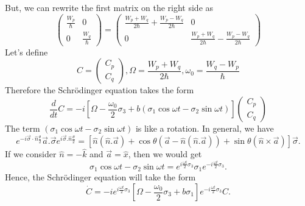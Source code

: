 But, we can rewrite the first matrix on the right side as
\begin{equation}
\left( \begin{array}{cc}
\frac{W_p}{\hbar} & 0 \\
0 & \frac{W_q}{\hbar}
\end{array} \right) = \left(
\begin{array}{cc}
\frac{W_p+W_q}{2\hbar} + \frac{W_p-W_q}{2\hbar} & 0 \\
0 & \frac{W_p+W_q}{2\hbar}-\frac{W_p-W_q}{2\hbar}
\end{array} \right)
\end{equation}
Let's define
\begin{equation}
C=\left( \begin{array}{c}
C_p \\
C_q
\end{array}\right) , 
\Omega=\frac{W_p+W_q}{2\hbar} ,
\omega_0=\frac{W_q-W_p}{\hbar}
\end{equation}
Therefore the Schr\"{o}dinger equation takes the form
\begin{equation}
\frac{d}{dt}C= -i \left[
\Omega -\frac{\omega_0}{2}\sigma_3 + b \left(\sigma_1 \cos{\omega t}  - \sigma_2\sin{\omega t}  \right) \right]\left( \begin{array}{c}
C_p \\
C_q
\end{array} \right)
\end{equation}
The term $\left( \sigma_1\cos{\omega t}  - \sigma_2 \sin{\omega t}  \right)$ is like a rotation. In general, we have
\begin{equation}
e^{-i \vec{\sigma}\cdot\hat{n} \frac{\theta}{2}} \vec{a}. \vec{\sigma} e^{i \vec{\sigma}.\hat{n} \frac{\theta}{2}}=\left[ \hat{n}(\hat{n}.\vec{a})+\cos\theta (\vec{a} - \hat{n} (\hat{n}.\vec{a}))+\sin \theta (\hat{n} \times \vec{a} )\right] \vec{\sigma} .
\end{equation}
If we consider $\hat{n}=-\hat{k}$ and $\vec{a}=\hat{x}$, then we would
get
\begin{equation}
\sigma_1 \cos{\omega t} - \sigma_2 \sin{\omega t} = e^{i \frac{\omega t}{2} \sigma_3} \sigma_1 e^{-i \frac{\omega t}{2}\sigma_3} .
\end{equation}
Hence, the Schr\"{o}dinger equation will take the form 
\begin{equation}
\dot{C}= -i e^{ i \frac{\omega t}{2}\sigma_3} \left[\Omega - \frac{\omega_0}{2} \sigma_3+b \sigma_1\right] e^{-i\frac{\omega t}{2}\sigma_3} C .
\end{equation}
